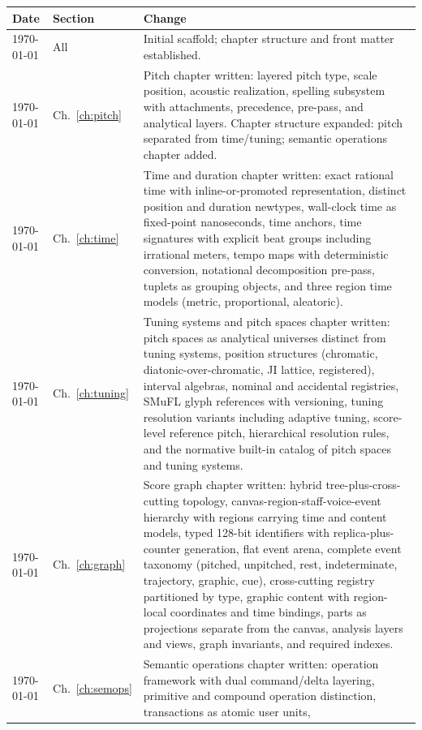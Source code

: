 \documentclass[11pt,letterpaper]{report}
\begin{document}
\begin{longtable}{p{2cm} p{2.5cm} p{9cm}}
  \toprule
  \textbf{Date} & \textbf{Section} & \textbf{Change} \\
  \midrule
  \endhead
  \today & All & Initial scaffold; chapter structure and front matter
  established. \\
  \today & Ch.~\ref{ch:pitch} & Pitch chapter written: layered pitch type,
  scale position, acoustic realization, spelling subsystem with attachments,
  precedence, pre-pass, and analytical layers. Chapter structure expanded:
  pitch separated from time/tuning; semantic operations chapter added. \\
  \today & Ch.~\ref{ch:time} & Time and duration chapter written: exact
  rational time with inline-or-promoted representation, distinct position
  and duration newtypes, wall-clock time as fixed-point nanoseconds, time
  anchors, time signatures with explicit beat groups including irrational
  meters, tempo maps with deterministic conversion, notational
  decomposition pre-pass, tuplets as grouping objects, and three region
  time models (metric, proportional, aleatoric). \\
  \today & Ch.~\ref{ch:tuning} & Tuning systems and pitch spaces chapter
  written: pitch spaces as analytical universes distinct from tuning
  systems, position structures (chromatic, diatonic-over-chromatic, JI
  lattice, registered), interval algebras, nominal and accidental
  registries, SMuFL glyph references with versioning, tuning resolution
  variants including adaptive tuning, score-level reference pitch,
  hierarchical resolution rules, and the normative built-in catalog of
  pitch spaces and tuning systems. \\
  \today & Ch.~\ref{ch:graph} & Score graph chapter written: hybrid
  tree-plus-cross-cutting topology, canvas-region-staff-voice-event
  hierarchy with regions carrying time and content models, typed 128-bit
  identifiers with replica-plus-counter generation, flat event arena,
  complete event taxonomy (pitched, unpitched, rest, indeterminate,
  trajectory, graphic, cue), cross-cutting registry partitioned by type,
  graphic content with region-local coordinates and time bindings, parts
  as projections separate from the canvas, analysis layers and views,
  graph invariants, and required indexes. \\
  \today & Ch.~\ref{ch:semops} & Semantic operations chapter written:
  operation framework with dual command/delta layering, primitive and
  compound operation distinction, transactions as atomic user units,

\end{longtable}
\end{document}
